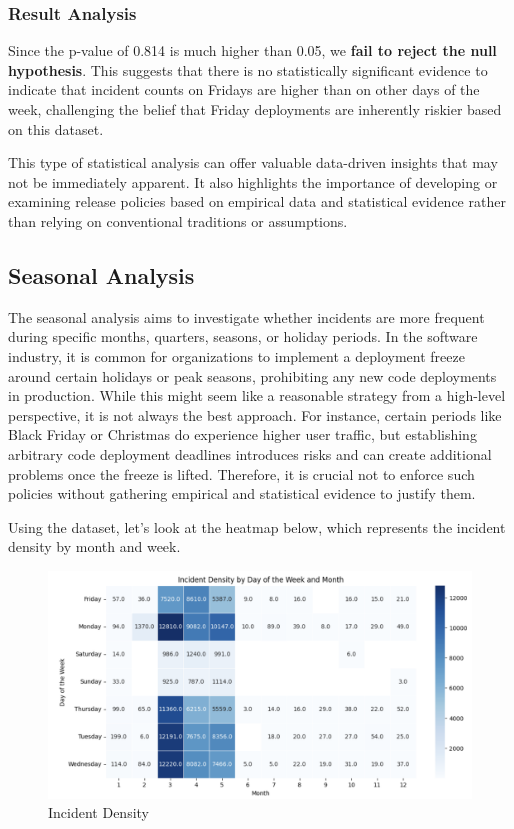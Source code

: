 \documentclass{article}
\begin{document}
\subsubsection{Result Analysis}

Since the p-value of 0.814 is much higher than 0.05, we \textbf{fail to reject the null hypothesis}. This suggests that there is no statistically significant evidence to indicate that incident counts on Fridays are higher than on other days of the week, challenging the belief that Friday deployments are inherently riskier based on this dataset. 

This type of statistical analysis can offer valuable data-driven insights that may not be immediately apparent. It also highlights the importance of developing or examining release policies based on empirical data and statistical evidence rather than relying on conventional traditions or assumptions.

\subsection{Seasonal Analysis}

The seasonal analysis aims to investigate whether incidents are more frequent during specific months, quarters, seasons, or holiday periods. In the software industry, it is common for organizations to implement a deployment freeze around certain holidays or peak seasons, prohibiting any new code deployments in production. While this might seem like a reasonable strategy from a high-level perspective, it is not always the best approach. For instance, certain periods like Black Friday or Christmas do experience higher user traffic, but establishing arbitrary code deployment deadlines introduces risks and can create additional problems once the freeze is lifted. Therefore, it is crucial not to enforce such policies without gathering empirical and statistical evidence to justify them.

Using the dataset, let's look at the heatmap below, which represents the incident density by month and week. 

\begin{figure}[H]
    \centering
    \includegraphics[width=0.7\linewidth]{Screenshot 2024-10-01 233549.png}
    \caption{Incident Density}
    \label{fig:enter-label}
\end{figure}
\end{document}
